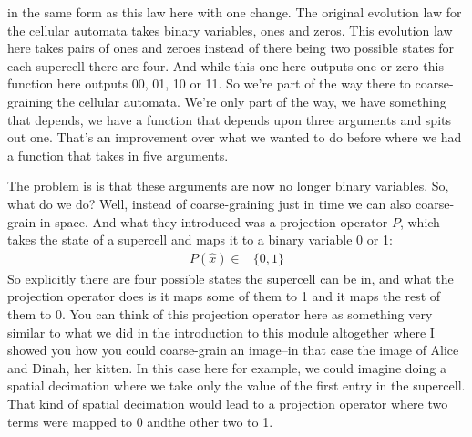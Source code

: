 \documentclass[]{article}
\begin{document}
in the same form as this law here with one change.
The original evolution law for the cellular automata takes binary variables, ones and zeros.
This evolution law here takes pairs of ones and zeroes instead of there being two possible states for each supercell there are four.
And while this one here outputs one or zero
this function here outputs 00, 01, 10 or 11.
So we're part of the way there to coarse-graining the cellular automata.
We're only part of the way, we have something that depends, we have a function that depends upon three arguments and spits out one.
That's an improvement over what we wanted to do before where we had a function that takes in five arguments.

The problem is is that these arguments are now no longer binary variables.
So, what do we do? Well, instead of coarse-graining just in time we can also
coarse-grain in space.
And what they introduced was a projection operator $P$, which takes the state of a supercell and maps it to a binary variable 0 or 1:
\begin{align*}
	P(\hat{x}) \in& \{0,1\}
\end{align*}
So explicitly there are four possible states the supercell can be in,
and what the projection operator does is it maps some of them to 1 and it maps the rest of them to 0.
You can think of this projection operator here as something very similar to what we did in the introduction to this module altogether where I showed you how you could coarse-grain an image--in that case the image of Alice and Dinah, her kitten.
In this case here for example, we could imagine doing a spatial decimation where we take only the value of the first entry in the supercell.
That kind of spatial decimation would lead to a projection operator where two terms were mapped to 0 andthe other two to 1.
\end{document}
